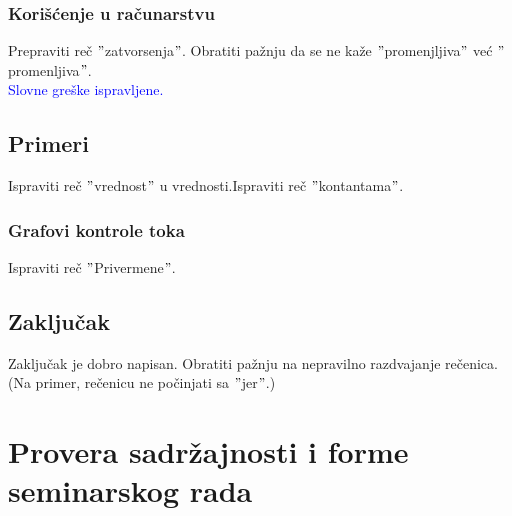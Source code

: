 \documentclass[a4paper]{report}
\newcommand{\odgovor}[1]{\textcolor{blue}{#1}}
\begin{document}
\subsubsection{Korišćenje u računarstvu}
Prepraviti reč $"$zatvorsenja$"$. Obratiti pažnju da se ne kaže $"$promenjljiva$"$ već $"$promenljiva$"$. \\
\odgovor{Slovne greške ispravljene.}

\subsection{Primeri}
Ispraviti reč $"$vrednost$"$ u vrednosti.Ispraviti reč $"$kontantama$"$. 
\subsubsection{Grafovi kontrole toka}
Ispraviti reč $"$Privermene$"$.

\subsection{Zaključak}
Zaključak je dobro napisan. Obratiti pažnju na nepravilno razdvajanje rečenica. (Na primer, rečenicu ne počinjati sa $"$jer$"$.)
\section{Provera sadržajnosti i forme seminarskog rada}
\end{document}
